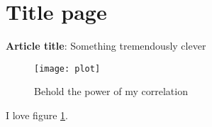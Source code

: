 \documentclass[12pt]{report}
\begin{document}
\section*{Title page}
\textbf{Article title}: Something tremendously clever



\begin{figure}[h!]
  \texttt{[image: plot]}
  \caption{Behold the power of my correlation}
  \label{ploty}
\end{figure}

I love figure \ref{ploty}.
\end{document}
